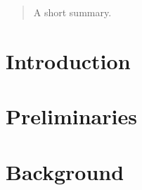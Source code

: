 \documentclass[english,master]{swsLeipzig}
\begin{document}
\begin{frontmatter}
  \begin{abstract}
    A short summary.
  \end{abstract}

  \tableofcontents





\end{frontmatter}

\chapter{Introduction}\label{introduction}


\chapter{Preliminaries}\label{preliminaries}


\chapter{Background}\label{background}



\appendix
\end{document}
